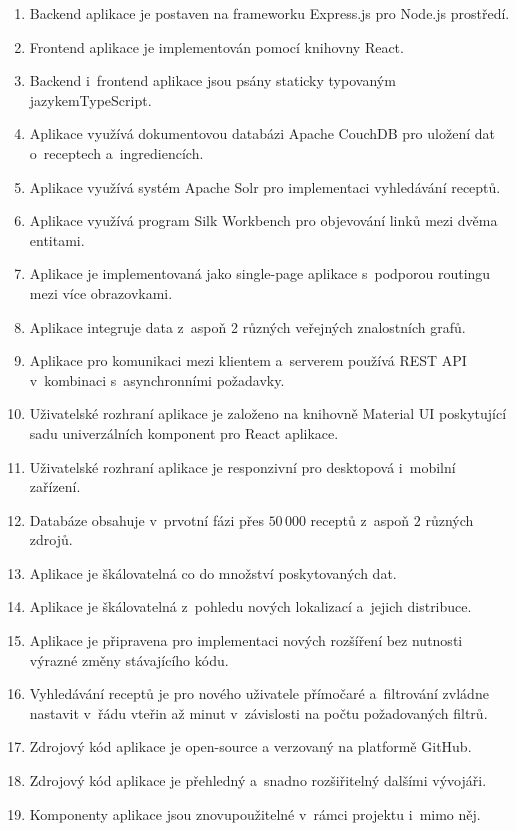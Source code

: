 \begin{enumerate}
    \item Backend aplikace je postaven na frameworku Express.js pro Node.js prostředí.
    \item Frontend aplikace je implementován pomocí knihovny React.
    \item Backend i~frontend aplikace jsou psány staticky typovaným jazykem\newline TypeScript.
    \item Aplikace využívá dokumentovou databázi Apache CouchDB pro uložení dat o~receptech a~ingrediencích.
    \item Aplikace využívá systém Apache Solr pro implementaci vyhledávání receptů.
    \item Aplikace využívá program Silk Workbench pro objevování linků mezi dvěma entitami.
    \item Aplikace je implementovaná jako single-page aplikace s~podporou routingu mezi více obrazovkami.
    \item Aplikace integruje data z~aspoň 2 různých veřejných znalostních grafů.
    \item Aplikace pro komunikaci mezi klientem a~serverem používá REST API v~kombinaci s~asynchronními požadavky. 
    \item Uživatelské rozhraní aplikace je založeno na knihovně Material UI poskytující sadu univerzálních komponent pro React aplikace.
    \item Uživatelské rozhraní aplikace je responzivní pro desktopová i~mobilní zařízení.
    \item Databáze obsahuje v~prvotní fázi přes $50\,000$ receptů z~aspoň $2$ různých zdrojů.
    \item Aplikace je škálovatelná co do množství poskytovaných dat.
    \item Aplikace je škálovatelná z~pohledu nových lokalizací a~jejich distribuce.
    \item Aplikace je připravena pro implementaci nových rozšíření bez nutnosti výrazné změny stávajícího kódu.
    \item Vyhledávání receptů je pro nového uživatele přímočaré a~filtrování zvládne nastavit v~řádu vteřin až minut v~závislosti na počtu požadovaných filtrů.
    \item Zdrojový kód aplikace je open-source a verzovaný na platformě GitHub.
    \item Zdrojový kód aplikace je přehledný a~snadno rozšiřitelný dalšími vývojáři.
    \item Komponenty aplikace jsou znovupoužitelné v~rámci projektu i~mimo něj.

\end{enumerate}
